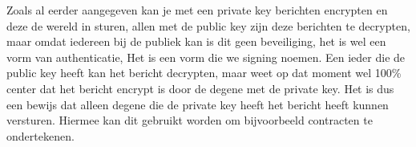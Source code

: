 Zoals al eerder aangegeven kan je met een private key berichten encrypten en deze de wereld in sturen, allen met de public key zijn deze berichten te decrypten, maar omdat iedereen bij de publiek kan is dit geen beveiliging, het is wel een vorm van authenticatie, Het is een vorm die we signing noemen. Een ieder die de public key heeft kan het bericht decrypten, maar weet op dat moment wel 100\% center dat het bericht encrypt is door de degene met de private key. Het is dus een bewijs dat alleen degene die de private key heeft het bericht heeft kunnen versturen. Hiermee kan dit gebruikt worden om bijvoorbeeld contracten te ondertekenen.
